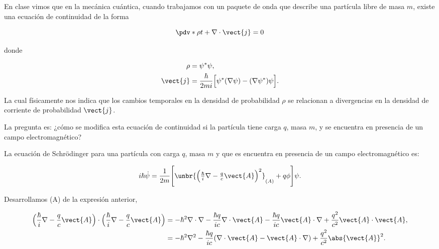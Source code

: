 \documentclass[../main.tex]{subfiles}
\begin{document}
\begin{problema}[20]
	En clase vimos que en la mecánica cuántica, cuando trabajamos con un
	paquete de onda que describe una partícula libre de masa \(m\), existe
	una ecuación de continuidad de la forma

	\begin{equation*}
		\pdv*{\rho}{t} + \nabla \cdot{\vect{j}} = 0
	\end{equation*}

	donde

	\begin{align*}
		\rho     & = \psi^{*}\psi ,                                                                 \\
		\vect{j} & = \dfrac{\hbar}{2mi}\Bigl[\psi^{*}(\nabla{\psi}) - (\nabla{\psi^{*}})\psi\Bigr].
	\end{align*}

	La cual físicamente nos indica que los cambios temporales en
	la densidad de probabilidad \(\rho\) se relacionan a divergencias
	en la densidad de corriente de probabilidad \(\vect{j}\).

	La pregunta es: ¿cómo se modifica esta ecuación de continuidad
	si la partícula tiene carga \(q\), masa \(m\), y se encuentra en
	presencia de un campo electromagnético?
\end{problema}

\startsolution

La ecuación de Schrödinger para una partícula con carga \(q\),
masa \(m\) y que es encuentra en presencia de un campo electromagnético
es:

\begin{equation}
	i\hbar \dot{\psi} = \dfrac{1}{2m}\Biggl[\unbr{ \Bigl(\tfrac{\hbar}{i}\nabla - \tfrac{q}{c}\vect{A}\Bigr)^{2} }_{(A)} + q\phi\Biggr]\psi.
	\label{eq:Schr-electromagnetic}
\end{equation}

Desarrollamos (A) de la expresión anterior,

\begin{align*}
	\Bigl(\dfrac{\hbar}{i}\nabla - \dfrac{q}{c}\vect{A}\Bigr)\cdot\Bigl(\dfrac{\hbar}{i}\nabla - \dfrac{q}{c}\vect{A}\Bigr) & =
	-\hbar^{2}\nabla \cdot{\nabla} - \dfrac{\hbar q}{ic}\nabla \cdot{\vect{A}} - \dfrac{\hbar q}{ic}\vect{A}\cdot\nabla + \dfrac{q^{2}}{c^{2}}\vect{A}\cdot \vect{A},                                                                                              \\
	                                                                                                                        & = -\hbar^{2}\nabla^{2} - \dfrac{\hbar q}{ic}(\nabla \cdot{\vect{A}} - \vect{A}\cdot\nabla) + \dfrac{q^{2}}{c^{2}}\abs{\vect{A}}^{2}.
\end{align*}
\end{document}
